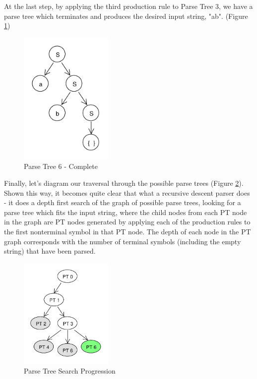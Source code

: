 \documentclass[11pt]{article}
\begin{document}
At the last step, by applying the third production rule to Parse Tree 3, we have a parse tree which terminates and produces the
desired input string, "ab". (Figure \ref{fig:rdp_6})

\begin{figure}[h!]
    \centering
    \includegraphics[width=0.4\textwidth,natwidth=30,natheight=30]{rdp_6.pdf}
    \caption{Parse Tree 6 - Complete}
    \label{fig:rdp_6}
\end{figure}

Finally, let's diagram our traversal through the possible parse trees (Figure \ref{fig:rdp_7}). Shown this way, it becomes quite
clear that what a recursive descent parser does - it does a depth first search of the graph of possible parse trees, looking
for a parse tree which fits the input string, where the child nodes from each PT node in the graph are PT nodes generated by
applying each of the production rules to the first nonterminal symbol in that PT node. The depth of each node in the PT graph
corresponds with the number of terminal symbols (including the empty string) that have been parsed.

\begin{figure}[h!]
    \centering
    \includegraphics[width=0.4\textwidth,natwidth=30,natheight=30]{rdp_7.pdf}
    \caption{Parse Tree Search Progression}
    \label{fig:rdp_7}
\end{figure}
\end{document}
